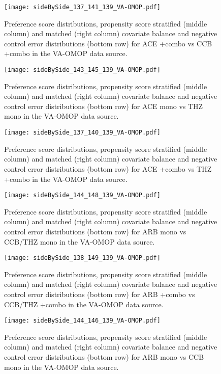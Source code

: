 \documentclass[11pt,]{article}
\begin{document}
\begin{figure}
    \caption{Preference score distributions,
    propensity score stratified (middle column) and matched (right column) covariate balance
    and negative control error distributions (bottom row) for
    ACE +combo vs CCB +combo in the VA-OMOP data source.}
    \centerline{
        \texttt{[image: sideBySide\_137\_141\_139\_VA-OMOP.pdf]}
    }
\end{figure}
\begin{figure}
    \caption{Preference score distributions,
    propensity score stratified (middle column) and matched (right column) covariate balance
    and negative control error distributions (bottom row) for
    ACE mono vs THZ mono in the VA-OMOP data source.}
    \centerline{
        \texttt{[image: sideBySide\_143\_145\_139\_VA-OMOP.pdf]}
    }
\end{figure}
\begin{figure}
    \caption{Preference score distributions,
    propensity score stratified (middle column) and matched (right column) covariate balance
    and negative control error distributions (bottom row) for
    ACE +combo vs THZ +combo in the VA-OMOP data source.}
    \centerline{
        \texttt{[image: sideBySide\_137\_140\_139\_VA-OMOP.pdf]}
    }
\end{figure}
\begin{figure}
    \caption{Preference score distributions,
    propensity score stratified (middle column) and matched (right column) covariate balance
    and negative control error distributions (bottom row) for
    ARB mono vs CCB/THZ mono in the VA-OMOP data source.}
    \centerline{
        \texttt{[image: sideBySide\_144\_148\_139\_VA-OMOP.pdf]}
    }
\end{figure}
\begin{figure}
    \caption{Preference score distributions,
    propensity score stratified (middle column) and matched (right column) covariate balance
    and negative control error distributions (bottom row) for
    ARB +combo vs CCB/THZ +combo in the VA-OMOP data source.}
    \centerline{
        \texttt{[image: sideBySide\_138\_149\_139\_VA-OMOP.pdf]}
    }
\end{figure}
\begin{figure}
    \caption{Preference score distributions,
    propensity score stratified (middle column) and matched (right column) covariate balance
    and negative control error distributions (bottom row) for
    ARB mono vs CCB mono in the VA-OMOP data source.}
    \centerline{
        \texttt{[image: sideBySide\_144\_146\_139\_VA-OMOP.pdf]}
    }
\end{figure}
\end{document}
